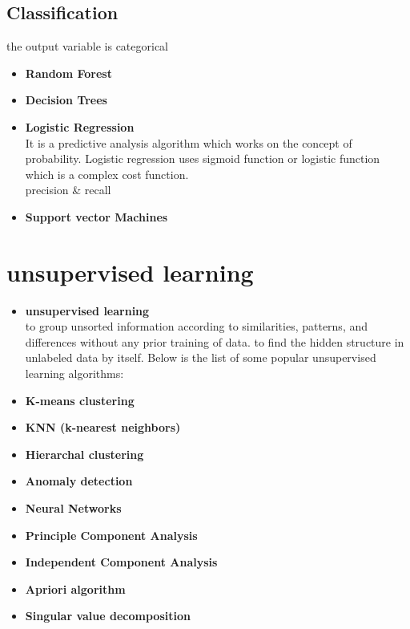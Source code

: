 \documentclass{article}
\begin{document}
\subsection*{Classification}
the output variable is categorical
\begin{itemize}
\item\textbf{Random Forest}\\

\item\textbf{Decision Trees}\\

\item\textbf{Logistic Regression}\\
It is a predictive analysis algorithm which works on the concept of probability. Logistic regression uses sigmoid function or logistic function which is a complex cost function. \\
precision \& recall
\item\textbf{Support vector Machines}\\

\end{itemize}

\section{unsupervised learning}
\begin{itemize}
\item \textbf{unsupervised learning}\\
to group unsorted information according to similarities, patterns, and differences without any prior training of data. to find the hidden structure in unlabeled data by itself.
Below is the list of some popular unsupervised learning algorithms:

\item\textbf{K-means clustering}\\

\item\textbf{KNN (k-nearest neighbors)}\\

\item\textbf{Hierarchal clustering}\\

\item\textbf{Anomaly detection}\\

\item\textbf{Neural Networks}\\

\item\textbf{Principle Component Analysis}\\

\item\textbf{Independent Component Analysis}\\

\item\textbf{Apriori algorithm}\\

\item\textbf{Singular value decomposition}\\

\end{itemize}
\end{document}

